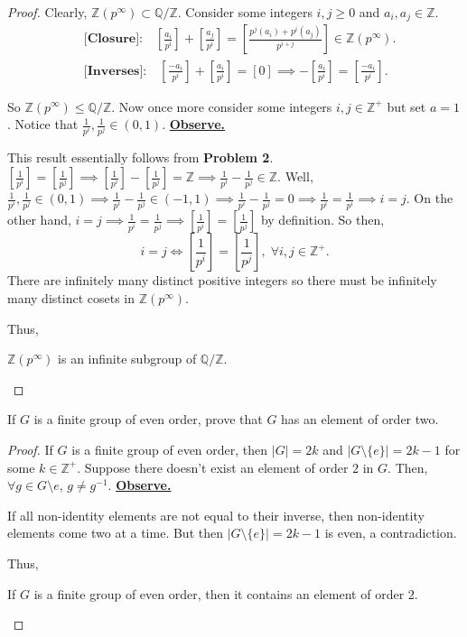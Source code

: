 \documentclass[addpoints,10pt]{exam}
\theoremstyle{plain}
\theoremstyle{definition}
\newtheorem{prob}[thm]{Problem}
\theoremstyle{plain}
\theoremstyle{plain}
\theoremstyle{definition}
\let\oldprob\prob
\let\endoldprob\endprob
\renewenvironment{prob}
  {\begin{singlespace}\oldprob}
  {\endoldprob\end{singlespace}}
\newcommand{\Observe}{\underline{\textbf{Observe.}}}
\newcommand{\QQ}{\ensuremath{\mathbb{Q}}}
\newcommand{\ZZ}{\ensuremath{\mathbb{Z}}}
\begin{document}
\begin{proof}
    Clearly, $\ZZ(p^{\infty})\subset \QQ/\ZZ$. Consider some integers $i,j\geq 0$ and $a_{i},a_{j}\in \ZZ$. 
    \begin{align*}
    &\textbf{[Closure]:}\quad[\frac{a_{i}}{p^{i}}]+[\frac{a_{j}}{p^{i}}]=[\frac{p^{j}(a_{i})+p^{i}(a_{j})}{p^{i+j}}]\in \ZZ(p^{\infty}).\\
    &\textbf{[Inverses]:}\quad[\frac{-a_{i}}{p^{i}}]+[\frac{a_{i}}{p^{i}}]=[0]\implies -[\frac{a_{i}}{p^{i}}]=[\frac{-a_{i}}{p^{i}}].
    \end{align*}

    So $\ZZ(p^{\infty})\leq \QQ/\ZZ$. Now once more consider some integers $i,j\in \ZZ^{+}$ but set $a=1$. Notice that $\frac{1}{p^{i}},\frac{1}{p^{j}}\in (0,1)$. \underline{\textbf{Observe.}}

    This result essentially follows from \textbf{Problem 2}. $[\frac{1}{p^{i}}]=[\frac{1}{p^{j}}]\implies [\frac{1}{p^{i}}]-[\frac{1}{p^{j}}]=\ZZ\implies \frac{1}{p^{i}}-\frac{1}{p^{j}}\in \ZZ$. Well, $\frac{1}{p^{i}},\frac{1}{p^{j}}\in (0,1)\implies \frac{1}{p^{i}}-\frac{1}{p^{j}}\in (-1,1)\implies \frac{1}{p^{i}}-\frac{1}{p^{j}}=0\implies \frac{1}{p^{i}}=\frac{1}{p^{i}}\implies i=j$. On the other hand, $i=j\implies \frac{1}{p^{i}}=\frac{1}{p^{j}}\implies [\frac{1}{p^{i}}]=[\frac{1}{p^{j}}]$ by definition. So then,
    $$i=j\iff [\frac{1}{p^{i}}]=[\frac{1}{p^{j}}],\;\forall i,j\in \ZZ^{+}.$$
    There are infinitely many distinct positive integers so there must be infinitely many distinct cosets in $\ZZ(p^{\infty})$.

    Thus,
    \begin{center}
    $\ZZ(p^{\infty})$ is an infinite subgroup of $\QQ/\ZZ$.
    \end{center}
\end{proof}
\newpage

\begin{prob}
If $G$ is a finite group of even order, prove that $G$ has an element of order two. 
\end{prob}

\begin{proof}
If $G$ is a finite group of even order, then $|G|=2k$ and $|G\setminus\{e\}|=2k-1$ for some $k\in \ZZ^{+}.$ Suppose there doesn't exist an element of order $2$ in $G$. Then, $\forall g\in G\setminus{e}$, $g\neq g^{-1}$. \Observe

If all non-identity elements are not equal to their inverse, then non-identity elements come two at a time. But then $|G\setminus \{e\}|=2k-1$ is even, a contradiction.

Thus,

\begin{center}
If $G$ is a finite group of even order, then it contains an element of order $2$.
\end{center}
\end{proof}
\end{document}
